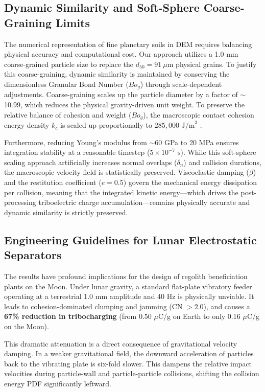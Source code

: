 \documentclass[preprint,12pt,authoryear]{elsarticle}
\begin{document}
\subsection{Dynamic Similarity and Soft-Sphere Coarse-Graining Limits}
The numerical representation of fine planetary soils in DEM requires balancing physical accuracy and computational cost. Our approach utilizes a 1.0 mm coarse-grained particle size to replace the $d_{50} = 91\ \mu\mathrm{m}$ physical grains. To justify this coarse-graining, dynamic similarity is maintained by conserving the dimensionless Granular Bond Number ($Bo_g$) through scale-dependent adjustments. Coarse-graining scales up the particle diameter by a factor of $\sim$10.99, which reduces the physical gravity-driven unit weight. To preserve the relative balance of cohesion and weight ($Bo_g$), the macroscopic contact cohesion energy density $k_c$ is scaled up proportionally to $285,000\text{ J/m}^3$ \citep{Roessler2018}.

Furthermore, reducing Young's modulus from $\sim$60 GPa to 20 MPa ensures integration stability at a reasonable timestep ($5 \times 10^{-7}\text{ s}$). While this soft-sphere scaling approach artificially increases normal overlaps ($\delta_n$) and collision durations, the macroscopic velocity field is statistically preserved. Viscoelastic damping ($\beta$) and the restitution coefficient ($e=0.5$) govern the mechanical energy dissipation per collision, meaning that the integrated kinetic energy—which drives the post-processing triboelectric charge accumulation—remains physically accurate and dynamic similarity is strictly preserved.

\subsection{Engineering Guidelines for Lunar Electrostatic Separators}
The results have profound implications for the design of regolith beneficiation plants on the Moon. Under lunar gravity, a standard flat-plate vibratory feeder operating at a terrestrial 1.0 mm amplitude and 40 Hz is physically unviable. It leads to cohesion-dominated clumping and jamming (CN $> 2.0$), and causes a \textbf{67\% reduction in tribocharging} (from 0.50 $\mu$C/g on Earth to only 0.16 $\mu$C/g on the Moon). 

This dramatic attenuation is a direct consequence of gravitational velocity damping. In a weaker gravitational field, the downward acceleration of particles back to the vibrating plate is six-fold slower. This dampens the relative impact velocities during particle-wall and particle-particle collisions, shifting the collision energy PDF significantly leftward. 
\end{document}
